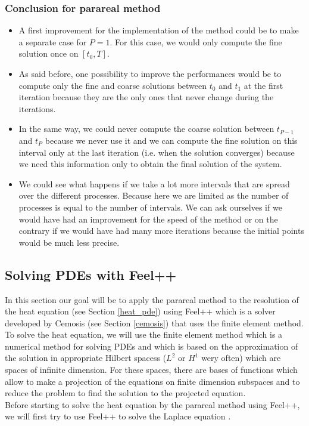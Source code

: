 \subsubsection{Conclusion for parareal method}
\label{improve}

\begin{itemize}[label=-]
	\item A first improvement for the implementation of the method could be to make a separate case for $P=1$. For this case, we would only compute the fine solution once on $[t_0,T]$.
	\item As said before, one possibility to improve the performances would be to compute only the fine and coarse solutions between $t_0$ and $t_1$ at the first iteration because they are the only ones that never change during the iterations. 
	\item In the same way, we could never compute the coarse solution between $t_{P-1}$ and $t_P$ because we never use it and we can compute the fine solution on this interval only at the last iteration (i.e. when the solution converges) because we need this information only to obtain the final solution of the system.
	\item We could see what happens if we take a lot more intervals that are spread over the different processes. Because here we are limited as the number of processes is equal to the number of intervals. We can ask ourselves if we would have had an improvement for the speed of the method or on the contrary if we would have had many more iterations because the initial points would be much less precise.
\end{itemize}


\subsection{Solving PDEs with Feel++}

In this section our goal will be to apply the parareal method to the resolution of the heat equation (see Section \ref{heat_pde}) using Feel++ which is a solver developed by Cemosis (see Section \ref{cemosis}) that uses the finite element method. \\
To solve the heat equation, we will use the finite element method which is a numerical method for solving PDEs and which is based on the approximation of the solution in appropriate Hilbert spacess ($L^2$ or $H^1$ wery often) which are spaces of infinite dimension. For these spaces, there are bases of functions which allow to make a projection of the equations on finite dimension subspaces and to reduce the problem to find the solution to the projected equation. \\
Before starting to solve the heat equation by the parareal method using Feel++, we will first try to use Feel++ to solve the Laplace equation \cite{feelpp_laplacian}.

